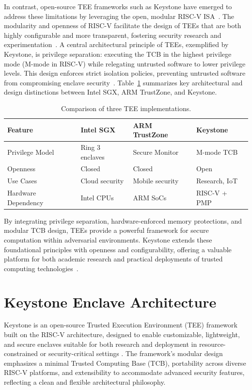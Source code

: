 In contrast, open-source TEE frameworks such as Keystone have emerged to address these limitations by leveraging the open, modular RISC-V ISA~\cite{Lee2019}. The modularity and openness of RISC-V facilitate the design of TEEs that are both highly configurable and more transparent, fostering security research and experimentation~\cite{Survey2023}. A central architectural principle of TEEs, exemplified by Keystone, is privilege separation: executing the TCB in the highest privilege mode (M-mode in RISC-V) while relegating untrusted software to lower privilege levels. This design enforces strict isolation policies, preventing untrusted software from compromising enclave security~\cite{Lee2019}.
Table~\ref{tab:tee-comparison} summarizes key architectural and design distinctions between Intel SGX, ARM TrustZone, and Keystone.

\begin{table}[htbp]
\centering
\caption{Comparison of three TEE implementations.}
\label{tab:tee-comparison}
\small
\begin{tabular}{@{}p{3cm}p{2.5cm}p{2.5cm}p{2.5cm}@{}}
\toprule
\textbf{Feature} & \textbf{Intel SGX} & \textbf{ARM TrustZone} & \textbf{Keystone} \\
\midrule
Privilege Model & Ring 3 enclaves & Secure Monitor & M-mode TCB \\
Openness & Closed & Closed & Open \\
Use Cases & Cloud security & Mobile security & Research, IoT \\
Hardware Dependency & Intel CPUs & ARM SoCs & RISC-V + PMP \\
\bottomrule
\end{tabular}
\end{table}


By integrating privilege separation, hardware-enforced memory protections, and modular TCB design, TEEs provide a powerful framework for secure computation within adversarial environments. Keystone extends these foundational principles with openness and configurability, offering a valuable platform for both academic research and practical deployments of trusted computing technologies~\cite{suzaki2021tsperf}.


\section{Keystone Enclave Architecture}

Keystone is an open-source Trusted Execution Environment (TEE) framework built on the RISC-V architecture, designed to enable customizable, lightweight, and secure enclaves suitable for both research and deployment in resource-constrained or security-critical settings \cite{Lee2019}. The framework’s modular design emphasizes a minimal Trusted Computing Base (TCB), portability across diverse RISC-V platforms, and extensibility to accommodate advanced security features, reflecting a clean and flexible architectural philosophy.

